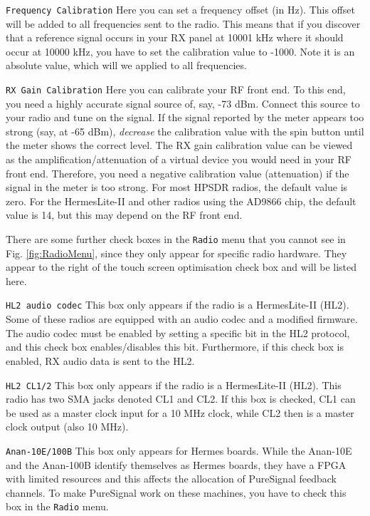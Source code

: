 \documentclass[12pt]{book}
\def\rett#1{\texttt{\color{red}#1}}
\def\bltt#1{\texttt{\color{blue}#1}}
\begin{document}
\rett{Frequency Calibration} Here you can set a frequency offset (in Hz). This offset
will be added to all frequencies sent to the radio. This means that if you discover that
a reference signal occurs in your RX panel at 10001 kHz where it should occur at 10000
kHz, you have to set the calibration value to -1000. Note it is an absolute value,
which will we applied to all frequencies.

\rett{RX Gain Calibration} Here you can calibrate your RF front end. To this end, you
need a highly accurate signal source of, say, -73 dBm. Connect this source to your
radio and tune on the signal. If the signal reported by the meter
appears too strong (say, at -65 dBm),
\textit{decrease} the
calibration value with the spin button until the meter shows the correct level.
The RX gain calibration value can be viewed as the  amplification/attenuation of
a virtual device you
would need in your RF front end. Therefore, you need a negative calibration value (attenuation)
if the signal in the meter is too strong. For most HPSDR radios, the default value is
zero. For the HermesLite-II and other radios using the AD9866 chip, the default
value is 14, but this may depend on the RF front end.

There are some further check boxes in the \bltt{Radio} menu that you cannot see
in Fig. \ref{fig:RadioMenu}, since they only appear for specific radio hardware.
They appear to the right of the touch screen optimisation check box
and will be listed here.

\rett{HL2 audio codec} This box only appears if the radio is a HermesLite-II (HL2). Some
of these radios are equipped with an audio codec and a modified firmware. The
audio codec must be enabled by setting a specific bit in the HL2 protocol,
and this check box enables/disables this bit. Furthermore, if this check box
is enabled, RX audio data is sent to the HL2.

\rett{HL2 CL1/2} This box only appears if the radio is a HermesLite-II (HL2). This
radio has two SMA jacks denoted CL1 and CL2. If this box is checked, CL1 can be
used as a master clock input for a 10 MHz clock, while CL2 then is a master
clock output (also 10 MHz).

\rett{Anan-10E/100B} This box only appears for Hermes boards. While the Anan-10E and
the Anan-100B identify themselves as Hermes boards, they have a FPGA with limited
resources and this affects the allocation of PureSignal feedback channels. To make
PureSignal work on these machines, you have to check this box in the \bltt{Radio} menu.
\end{document}
